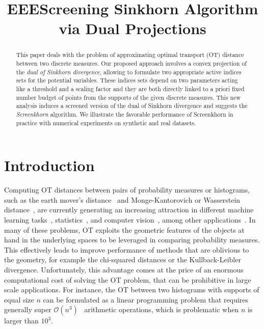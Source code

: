 \documentclass{article}
\title{EEEScreening Sinkhorn Algorithm via Dual Projections}
\newcommand{\bigO}{\mathcal{O}}
\begin{document}
\maketitle

\begin{abstract}

This paper deals with the problem of approximating optimal transport (OT) distance between two discrete measures.
Our proposed approach involves a convex projection of the \emph{dual of Sinkhorn divergence}, allowing to formulate two appropriate active indices sets for the potential variables.
These indices sets depend on two parameters acting like a threshold and a scaling factor and they are both directly linked to a priori fixed number budget of points from the supports of the given discrete measures.
This new analysis induces a screened version of the dual of Sinkhorn divergence and suggests the \emph{Screenkhorn} algorithm.
We illustrate the favorable performance of Screenkhorn in practice with numerical experiments on synthetic and real datasets.
\end{abstract}

\section{Introduction}

Computing OT distances between pairs of probability measures or histograms, such as the earth mover's distance~\cite{werman1985,Rubner2000} and Monge-Kantorovich or Wasserstein distance~\cite{villani09optimal}, are currently generating an increasing attraction in different machine learning tasks~\cite{pmlr-v32-solomon14,kusnerb2015,pmlr-v70-arjovsky17a,ho2017}, statistics~\cite{frogner2015nips,panaretos2016,ebert2017ConstructionON,bigot2017,flamary2018WDA}, and computer vision~\cite{bonnel2011,Rubner2000,solomon2015}, among other applications~\cite{klouri17,peyre2019COTnowpublisher}.
In many of these problems, OT exploits the geometric features of the objects at hand in the underlying spaces to be leveraged in comparing probability measures.
This effectively leads to improve performance of methods that are oblivious to the geometry, for example the chi-squared distances or the Kullback-Leibler divergence.
Unfortunately, this advantage comes at the price of an enormous computational cost of solving the OT problem, that can be prohibitive in large scale applications.
For instance, the OT between two histograms with supports of equal size $n$ can be formulated as a linear programming problem that requires generally super $\bigO(n^3)$~\cite{pele2009} arithmetic operations, which is problematic when $n$ is larger than $10^3.$
\end{document}
